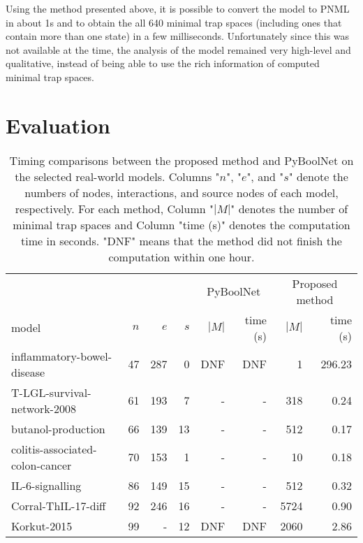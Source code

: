 \documentclass[runningheads]{llncs}
\begin{document}
Using the method presented above, it is possible to convert the model to PNML in about 1s and to obtain the all 640 minimal trap spaces (including ones that contain more than one state) in a few milliseconds.
Unfortunately since this was not available at the time, the analysis of the model remained very high-level and qualitative, instead of being able to use the rich information of computed minimal trap spaces.

\section{Evaluation}
\label{sec:eval}

\begin{table}[!htb]
  \caption{Timing comparisons between the proposed method and PyBoolNet on the selected real-world models.
    Columns "\(n\)", "\(e\)", and "\(s\)" denote the numbers of nodes, interactions, and source nodes of each model, respectively. For each method, Column "\(|M|\)" denotes the number of minimal trap spaces and Column "time (s)" denotes the computation time in seconds.
    "DNF" means that the method did not finish the computation within one hour.}
  \centering
  \label{tab:result_real}
  \begin{tabular}{lrrrrrrr}
    \toprule
    & & & & \multicolumn{2}{c}{PyBoolNet} & \multicolumn{2}{c}{Proposed method}\\
    \cmidrule(lr){5-6}\cmidrule(lr){7-8}
    model & $n$ & $e$ & $s$ & $|M|$ & time (s) & $|M|$ & time (s) \\ \midrule
    inflammatory-bowel-disease~\cite{DBLP:journals/bmcsb/HelikarKMBRMWSLR12} & 47 & 287 & 0 & DNF & DNF & 1 & 296.23 \\
    T-LGL-survival-network-2008~\cite{DBLP:journals/bmcsb/HelikarKMBRMWSLR12} & 61 & 193 & 7 & - & - & 318 & 0.24 \\
    butanol-production~\cite{DBLP:journals/bmcsb/HelikarKMBRMWSLR12} & 66 & 139 & 13 & - & - & 512 & 0.17 \\
    colitis-associated-colon-cancer~\cite{DBLP:journals/bmcsb/HelikarKMBRMWSLR12} & 70 & 153 & 1 & - & - & 10 & 0.18 \\
    IL-6-signalling~\cite{DBLP:journals/bmcsb/HelikarKMBRMWSLR12} & 86 & 149 & 15 & - & - & 512 & 0.32 \\
    Corral-ThIL-17-diff~\cite{corral2021interplay} & 92 & 246 & 16 & - & - & 5724 & 0.90 \\
    Korkut-2015~\cite{lee2019signal} & 99 & - & 12 & DNF & DNF & 2060 & 2.86 \\ \midrule
    

\end{tabular}
\end{table}
\end{document}
